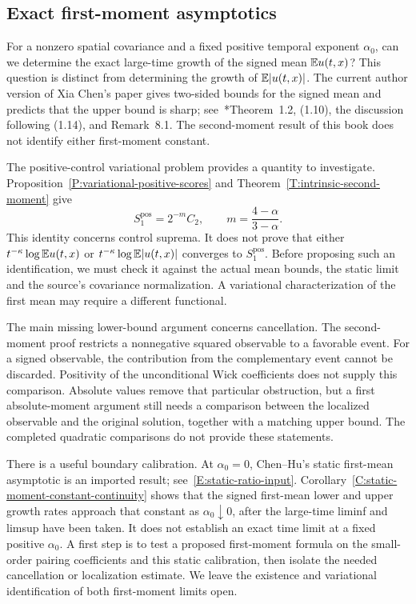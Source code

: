\subsection{Exact first-moment asymptotics}
\label{S:future-first-moment}

For a nonzero spatial covariance and a fixed positive temporal exponent
$\alpha_0$, can we determine the exact large-time growth of the signed mean
$\mathbb{E} u(t,x)$? This question is distinct
from determining the growth of $\mathbb{E}|u(t,x)|$. The current author version of
Xia Chen's paper gives two-sided bounds for the signed mean and predicts
that the upper bound is sharp;
see~\cite{chen:author2026:time-dependency}*{Theorem~1.2,
(1.10), the discussion following (1.14), and Remark~8.1}. The second-moment
result of this book does not identify either first-moment constant.

The positive-control variational problem provides a quantity to investigate.
Proposition~\ref{P:variational-positive-scores} and
Theorem~\ref{T:intrinsic-second-moment} give
\[
  S_1^{\mathrm{pos}}=2^{-m}C_2,
  \qquad m=\frac{4-\alpha}{3-\alpha}.
\]
This identity concerns control suprema. It does not prove that either
$t^{-\kappa}\log\mathbb{E} u(t,x)$ or $t^{-\kappa}\log\mathbb{E}|u(t,x)|$ converges to
$S_1^{\mathrm{pos}}$. Before proposing such an identification, we must check it
against the actual mean bounds, the static limit and the source's covariance
normalization. A variational characterization of the first mean may require
a different functional.

The main missing lower-bound argument concerns cancellation. The second-moment
proof restricts a nonnegative squared observable to a favorable event. For a
signed observable, the contribution from the complementary event cannot be
discarded. Positivity of the unconditional Wick coefficients does not supply
this comparison. Absolute values remove that particular obstruction, but a
first absolute-moment argument still needs a comparison between the localized
observable and the original solution, together with a matching upper bound.
The completed quadratic comparisons do not provide these statements.

There is a useful boundary calibration. At $\alpha_0=0$, Chen--Hu's static
first-mean asymptotic is an imported result; see~\eqref{E:static-ratio-input}.
Corollary~\ref{C:static-moment-constant-continuity} shows that the signed
first-mean lower and upper growth rates approach that constant as
$\alpha_0\downarrow0$, after the large-time liminf and limsup have been taken.
It does not establish an exact time limit at a fixed positive $\alpha_0$.
A first step is to test a proposed first-moment formula on the small-order
pairing coefficients and this static calibration, then isolate the needed
cancellation or localization estimate. We leave the existence and variational
identification of both first-moment limits open.
